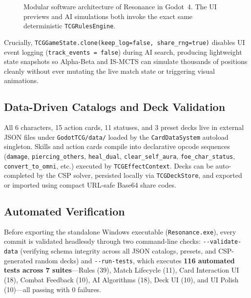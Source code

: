 \documentclass[11pt,a4paper]{article}
\begin{document}
\begin{figure}[H]
{}
\caption{Modular software architecture of Resonance in Godot~4. The UI previews and AI simulations both invoke the exact same deterministic \texttt{TCGRulesEngine}.}
\label{fig:architecture}
\end{figure}

Crucially, \texttt{TCGGameState.clone(keep\_log=false, share\_rng=true)} disables UI event logging (\texttt{track\_events = false}) during AI search, producing lightweight state snapshots so Alpha-Beta and IS-MCTS can simulate thousands of positions cleanly without ever mutating the live match state or triggering visual animations.

\subsection{Data-Driven Catalogs and Deck Validation}

All 6 characters, 15 action cards, 11 statuses, and 3 preset decks live in external JSON files under \texttt{GodotTCG/data/} loaded by the \texttt{CardDataSystem} autoload singleton. Skills and action cards compile into declarative opcode sequences (\texttt{damage}, \texttt{piercing\_others}, \texttt{heal\_dual}, \texttt{clear\_self\_aura}, \texttt{foe\_char\_status}, \texttt{convert\_to\_omni}, etc.) executed by \texttt{TCGEffectContext}. Decks can be auto-completed by the CSP solver, persisted locally via \texttt{TCGDeckStore}, and exported or imported using compact URL-safe Base64 share codes.

\subsection{Automated Verification}

Before exporting the standalone Windows executable (\texttt{Resonance.exe}), every commit is validated headlessly through two command-line checks: \texttt{-\/-validate-data} (verifying schema integrity across all JSON catalogs, presets, and CSP-generated random decks) and \texttt{-\/-run-tests}, which executes \textbf{116 automated tests across 7 suites}—Rules (39), Match Lifecycle (11), Card Interaction UI (18), Combat Feedback (10), AI Algorithms (18), Deck UI (10), and UI Polish (10)—all passing with 0 failures.
\end{document}
